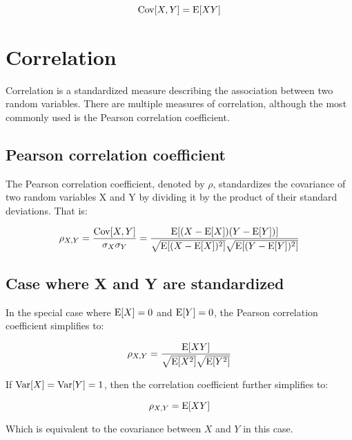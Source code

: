 \documentclass[12pt]{article}
\begin{document}
$$ \mathrm{Cov}[X,Y] = \mathrm{E}[XY] $$

\section{Correlation}

Correlation is a standardized measure describing the association between two random variables.
There are multiple measures of correlation, although the most commonly used is the Pearson correlation coefficient.

\subsection{Pearson correlation coefficient}

The Pearson correlation coefficient, denoted by $\rho$, standardizes the covariance of two random variables X and Y by dividing it by the product of their standard deviations. That is:

$$
\rho_{X,Y} =
\frac{\mathrm{Cov}[X,Y]}{\sigma_X \sigma_Y} =
\frac{\mathrm{E}[(X - \mathrm{E}[X])(Y - \mathrm{E}[Y])]}
{\sqrt{\mathrm{E}[ (X - \mathrm{E}[X])^2]} \sqrt{\mathrm{E}[ (Y - \mathrm{E}[Y])^2]}}
$$

\subsection{Case where X and Y are standardized}

In the special case where $\mathrm{E}[X] = 0$ and $\mathrm{E}[Y] = 0$, the Pearson correlation coefficient simplifies to:

$$ \rho_{X,Y} = \frac{\mathrm{E}[XY]}{\sqrt{\mathrm{E}[X^2]} \sqrt{\mathrm{E}[Y^2]}} $$

If $ \mathrm{Var}[X] = \mathrm{Var}[Y] = 1$, then the correlation coefficient further simplifies to:

$$ \rho_{X,Y} = \mathrm{E}[XY] $$

Which is equivalent to the covariance between $X$ and $Y$ in this case.
\end{document}
